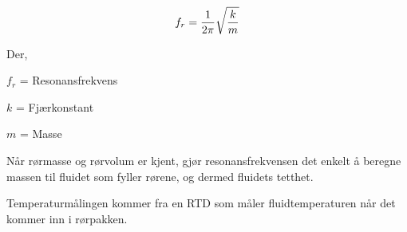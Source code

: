 $$f_r = {1 \over 2 \pi} \sqrt{k \over m}$$

\noindent
Der,

$f_r$ = Resonansfrekvens

$k$ = Fjærkonstant

$m$ = Masse 

\vskip 10pt

Når rørmasse og rørvolum er kjent, gjør resonansfrekvensen det enkelt å beregne massen til fluidet som fyller rørene, og dermed fluidets tetthet.

Temperaturmålingen kommer fra en RTD som måler fluidtemperaturen når det kommer inn i rørpakken.










